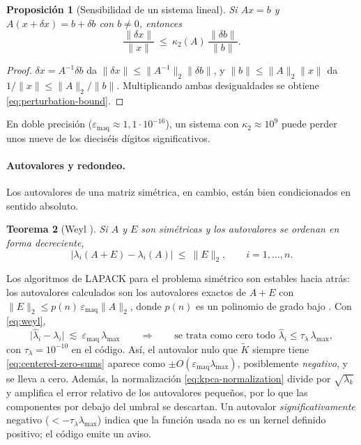 \documentclass[11pt,a4paper]{article}
\newcommand{\Kc}{\widetilde{K}}                   %
\newcommand{\norm}[1]{\lVert #1\rVert}
\newcommand{\abs}[1]{\lvert #1\rvert}
\theoremstyle{plain}
\newtheorem{teorema}{Teorema}[section]
\newtheorem{proposicion}[teorema]{Proposición}
\theoremstyle{definition}
\theoremstyle{remark}
\numberwithin{equation}{section}
\begin{document}
\begin{proposicion}[Sensibilidad de un sistema lineal]
Si $Ax=b$ y $A(x+\delta x)=b+\delta b$ con $b\ne0$, entonces
\begin{equation}\label{eq:perturbation-bound}
  \frac{\norm{\delta x}}{\norm x}\ \le\ \kappa_2(A)\,\frac{\norm{\delta b}}{\norm b} .
\end{equation}
\end{proposicion}
\begin{proof}
$\delta x=A^{-1}\delta b$ da $\norm{\delta x}\le\norm{A^{-1}}_2\norm{\delta b}$, y
$\norm b\le\norm A_2\norm x$ da $1/\norm x\le\norm A_2/\norm b$. Multiplicando ambas
desigualdades se obtiene \eqref{eq:perturbation-bound}.
\end{proof}
En doble precisión ($\varepsilon_{\mathrm{maq}}\approx1{,}1\cdot10^{-16}$), un sistema con
$\kappa_2\approx10^{9}$ puede perder unos nueve de los dieciséis dígitos significativos.

\paragraph{Autovalores y redondeo.} Los autovalores de una matriz simétrica, en cambio, están
bien condicionados en sentido absoluto.

\begin{teorema}[Weyl {\cite[teorema 4.3.1]{hornjohnson2013}}]
Si $A$ y $E$ son simétricas y los autovalores se ordenan en forma decreciente,
\begin{equation}\label{eq:weyl}
  \abs{\lambda_i(A+E)-\lambda_i(A)}\ \le\ \norm E_2,\qquad i=1,\dots,n .
\end{equation}
\end{teorema}
Los algoritmos de LAPACK para el problema simétrico son estables hacia atrás: los autovalores
calculados son los autovalores exactos de $A+E$ con
$\norm E_2\le p(n)\,\varepsilon_{\mathrm{maq}}\norm A_2$, donde $p(n)$ es un polinomio de
grado bajo \cite[capítulo 8]{golubvanloan2013}. Con \eqref{eq:weyl},
\begin{equation}\label{eq:eig-threshold}
  \abs{\hat\lambda_i-\lambda_i}\ \lesssim\ \varepsilon_{\mathrm{maq}}\,\lambda_{\max}
  \qquad\Longrightarrow\qquad
  \text{se trata como cero todo }\hat\lambda_i\le\tau_\lambda\,\lambda_{\max},
\end{equation}
con $\tau_\lambda=10^{-10}$ en el código. Así, el autovalor nulo que $\Kc$ siempre tiene
\eqref{eq:centered-zero-sums} aparece como $\pm O(\varepsilon_{\mathrm{maq}}\lambda_{\max})$,
posiblemente \emph{negativo}, y se lleva a cero. Además, la normalización
\eqref{eq:kpca-normalization} divide por $\sqrt{\lambda_k}$ y amplifica el error relativo de
los autovalores pequeños, por lo que las componentes por debajo del umbral se descartan. Un
autovalor \emph{significativamente} negativo ($<-\tau_\lambda\lambda_{\max}$) indica que la
función usada no es un kernel definido positivo; el código emite un aviso.
\end{document}
